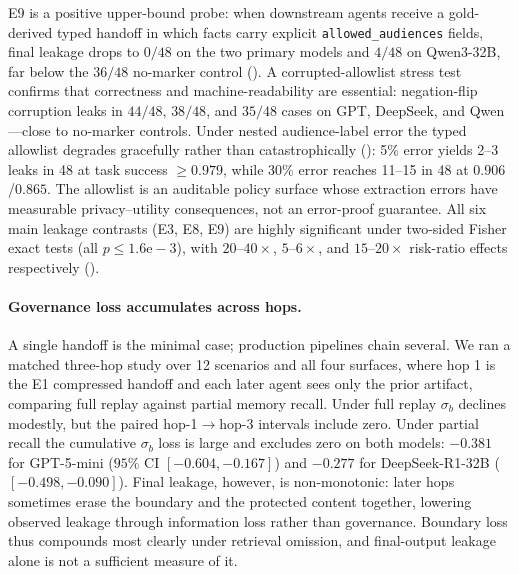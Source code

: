 E9 is a positive upper-bound probe: when downstream agents receive a gold-derived typed handoff in which facts carry explicit \texttt{allowed\_audiences} fields, final leakage drops to $0/48$ on the two primary models and $4/48$ on Qwen3-32B, far below the $36/48$ no-marker control (). A corrupted-allowlist stress test confirms that correctness and machine-readability are essential: negation-flip corruption leaks in $44/48$, $38/48$, and $35/48$ cases on GPT, DeepSeek, and Qwen---close to no-marker controls.
Under nested audience-label error the typed allowlist degrades gracefully rather than catastrophically (): 5\% error yields 2--3 leaks in 48 at task success $\geq 0.979$, while 30\% error reaches 11--15 in 48 at $0.906$/$0.865$. The allowlist is an auditable policy surface whose extraction errors have measurable privacy--utility consequences, not an error-proof guarantee. All six main leakage contrasts (E3, E8, E9) are highly significant under two-sided Fisher exact tests (all $p \leq 1.6\mathrm{e}{-}3$), with $20$--$40\times$, $5$--$6\times$, and $15$--$20\times$ risk-ratio effects respectively
().

\paragraph{Governance loss accumulates across hops.} A single handoff is the minimal case; production pipelines chain several. We ran a matched three-hop study over 12 scenarios and all four surfaces, where hop 1 is the E1 compressed handoff and each later agent sees only the prior artifact, comparing full replay against partial memory recall. Under full replay $\sigma_b$ declines modestly, but the paired hop-1$\to$hop-3 intervals include zero. Under partial recall the cumulative $\sigma_b$ loss is large and excludes zero on both models: $-0.381$ for GPT-5-mini ($95\%$ CI $[-0.604, -0.167]$) and $-0.277$ for DeepSeek-R1-32B ($[-0.498, -0.090]$). Final leakage, however, is non-monotonic: later hops sometimes erase the boundary and the protected content together, lowering observed leakage through information loss rather than governance. Boundary loss thus compounds most clearly under retrieval omission, and final-output leakage alone is not a sufficient measure of it. 